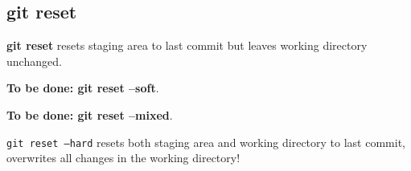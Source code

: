 %

\subsection{git reset}
\textbf{git reset} resets staging area to last commit but leaves working directory unchanged.

{\color{red} \textbf{To be done: git reset --soft}}.

{\color{red} \textbf{To be done: git reset --mixed}}.

\texttt{git reset --hard} resets both staging area and working directory to last commit, overwrites all changes in the working directory!


%